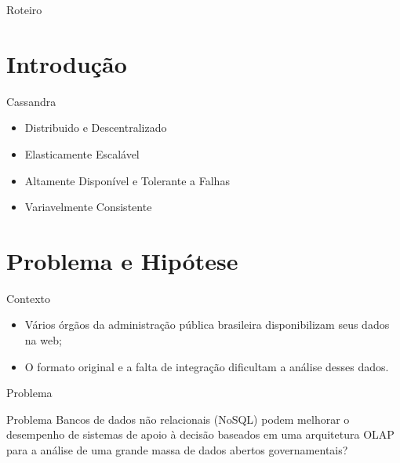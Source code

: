 
\begin{frame}
\titlepage
\end{frame}

\begin{frame}{Roteiro}
  \tableofcontents
\end{frame}

\section{Introdução}

\begin{frame}{Cassandra}
\begin{itemize}

\item Distribuido e Descentralizado
\item Elasticamente Escalável
\item Altamente Disponível e Tolerante a Falhas
\item Variavelmente Consistente

\end{itemize}
\end{frame}

\section{Problema e Hipótese}

\begin{frame}{Contexto}
    \begin{itemize}
      \item Vários órgãos da administração pública brasileira disponibilizam seus dados na web;
      
      \item O formato original e a falta de integração dificultam a análise desses dados.
  \end{itemize}
\end{frame}

\begin{frame}{Problema}
  \begin{block}{Problema}
Bancos de dados não relacionais (NoSQL) podem melhorar o desempenho de sistemas de apoio à decisão baseados em uma arquitetura OLAP para a análise de uma grande massa de dados abertos governamentais?
  \end{block}
\end{frame}

